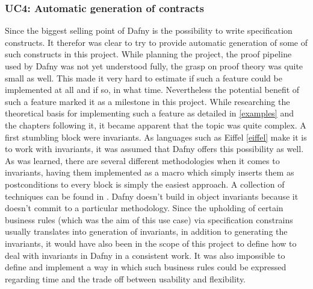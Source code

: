 \subsubsection{UC4: Automatic generation of contracts}\label{missinguc4}
Since the biggest selling point of Dafny is the possibility to write specification constructs. It therefor was clear to try to provide automatic generation of some of such constructs in this project. While planning the project, the proof pipeline used by Dafny was not yet understood fully, the grasp on proof theory was quite small as well. This made it very hard to estimate if such a feature could be implemented at all and if so, in what time. Nevertheless the potential benefit of such a feature marked it as a milestone in this project. \newline
While researching the theoretical basis for implementing such a feature as detailed in \ref{examples} and the chapters following it, it became apparent that the topic was quite complex. A first stumbling block were invariants. As languages such as Eiffel \ref{eiffel} make it is to work with invariants, it was assumed that Dafny offers this possibility as well. \newline
As was learned, there are several different methodologies when it comes to invariants, having them implemented as a macro which simply inserts them as postconditions to every block is simply the easiest approach. A collection of techniques can be found in \cite{invariants}. 
Dafny doesn't build in object invariants because it doesn't commit to a particular methodology. Since the upholding of certain business rules (which was the aim of this use case) via specification constrains usually translates into generation of invariants, in addition to generating the invariants, it would have also been in the scope of this project to define how to deal with invariants in Dafny in a consistent work. It was also impossible to define and implement a way in which such business rules could be expressed regarding time and the trade off between usability and flexibility.\newline
